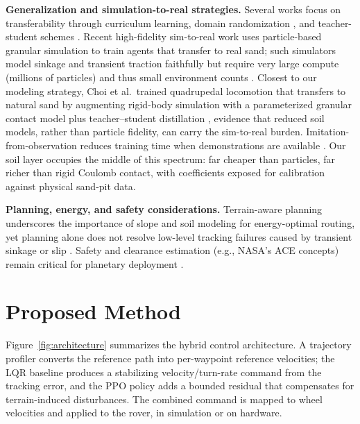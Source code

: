 \documentclass[conference]{IEEEtran}
\begin{document}
\vspace{2mm}
\noindent\textbf{Generalization and simulation-to-real strategies.} Several works focus on transferability through curriculum learning, domain randomization \cite{tobin2017domain}, and teacher-student schemes \cite{blum2020ppmc, mortensen2023teacher}. Recent high-fidelity sim-to-real work uses particle-based granular simulation to train agents that transfer to real sand; such simulators model sinkage and transient traction faithfully but require very large compute (millions of particles) and thus small environment counts \cite{orsula2025sim2dust}. Closest to our modeling strategy, Choi et al.\ trained quadrupedal locomotion that transfers to natural sand by augmenting rigid-body simulation with a parameterized granular contact model plus teacher--student distillation \cite{choi2023deformable}, evidence that reduced soil models, rather than particle fidelity, can carry the sim-to-real burden. Imitation-from-observation reduces training time when demonstrations are available \cite{wang2025rov}. Our soil layer occupies the middle of this spectrum: far cheaper than particles, far richer than rigid Coulomb contact, with coefficients exposed for calibration against physical sand-pit data.

\vspace{2mm}
\noindent\textbf{Planning, energy, and safety considerations.} Terrain-aware planning underscores the importance of slope and soil modeling for energy-optimal routing, yet planning alone does not resolve low-level tracking failures caused by transient sinkage or slip \cite{yang2025dqnt, zhang2023energy}. Safety and clearance estimation (e.g., NASA's ACE concepts) remain critical for planetary deployment \cite{nasaACE}.

\section{Proposed Method}
Figure~\ref{fig:architecture} summarizes the hybrid control architecture. A trajectory profiler converts the reference path into per-waypoint reference velocities; the LQR baseline produces a stabilizing velocity/turn-rate command from the tracking error, and the PPO policy adds a bounded residual that compensates for terrain-induced disturbances. The combined command is mapped to wheel velocities and applied to the rover, in simulation or on hardware.
\end{document}
